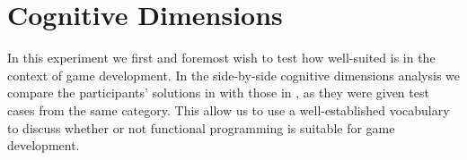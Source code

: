 \section{Cognitive Dimensions}
In this experiment we first and foremost wish to test how well-suited \fsh is in the context of game development. In the side-by-side cognitive dimensions analysis we compare the participants' solutions in \fsh with those in \csh, as they were given test cases from the same category. This allow us to use a well-established vocabulary to discuss whether or not functional programming is suitable for game development.















